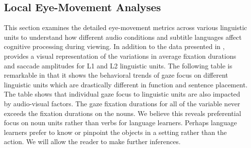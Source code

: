 \subsection{Local Eye-Movement Analyses}\label{sub-sec-localeyemovement}

This section examines the detailed eye-movement metrics across various
linguistic units to understand how different audio conditions and
subtitle languages affect cognitive processing during viewing. In
addition to the data presented in ,  provides a visual
representation of the variations in average fixation durations and
saccade amplitudes for L1 and L2 linguistic units. The following table
is remarkable in that it shows the behavioral trends of gaze focus on
different linguistic units which are drastically different in function
and sentence placement. The table shows that individual gaze focus to
linguistic units are also impacted by audio-visual factors. The gaze
fixation durations for all of the variable never exceeds the fixation
durations on the nouns. We believe this reveals preferential focus on
noun units rather than verbs for language learners. Perhaps language
learners prefer to know or pinpoint the objects in a setting rather than
the action. We will allow the reader to make further inferences.


